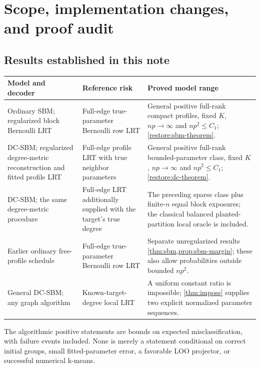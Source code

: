\section{Scope, implementation changes, and proof audit}
\label{sec:scope}

\subsection{Results established in this note}

\begin{center}
\small
\begin{tabular}{>{\raggedright\arraybackslash}p{}>{\raggedright\arraybackslash}p{}>{\raggedright\arraybackslash}p{}}
\toprule
Model and decoder & Reference risk & Proved model range\\
\midrule
Ordinary SBM; regularized block Bernoulli LRT
& Full-edge true-parameter Bernoulli row LRT
& General positive full-rank compact profiles, fixed $K$,
$np\to\infty$ and $np^2\le C_1$; \cref{restore:sbm-theorem}.\\[4pt]
DC-SBM; regularized degree-metric reconstruction and fitted profile LRT
& Full-edge profile LRT with true neighbor parameters
& General positive full-rank bounded-parameter class, fixed $K$,
$np\to\infty$ and $np^2\le C_1$; \cref{restore:dc-theorem}.\\[4pt]
DC-SBM; the same degree-metric procedure
& Full-edge LRT additionally supplied with the target's true degree
& The preceding sparse class plus finite-$n$ equal block exposures;
the classical balanced planted-partition local oracle is included.\\[4pt]
Earlier ordinary free-profile schedule
& Full-edge true-parameter Bernoulli row LRT
& Separate unregularized results \cref{thm:sbm,prop:sbm-margin};
these also allow probabilities outside bounded $np^2$.\\[4pt]
General DC-SBM; any graph algorithm
& Known-target-degree local LRT
& A uniform constant ratio is impossible; \cref{thm:imposs} supplies two
explicit normalized parameter sequences.\\
\bottomrule
\end{tabular}
\end{center}

The algorithmic positive statements are bounds on expected misclassification, with
failure events included. None is merely a statement conditional on correct
initial groups, small fitted-parameter error, a favorable LOO projector,
or successful numerical k-means.

